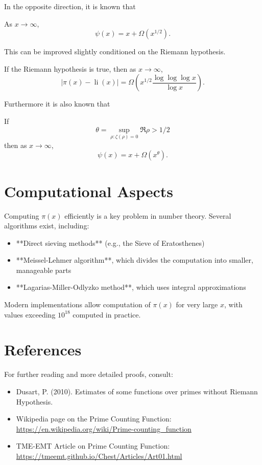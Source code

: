In the opposite direction, it is known that 
\begin{theorem}
As $x \to \infty$,
\[
\psi(x) = x + \Omega(x^{1/2}).
\]
\end{theorem}
This can be improved slightly conditioned on the Riemann hypothesis.
\begin{theorem}
If the Riemann hypothesis is true, then as $x \to \infty$,
\[
|\pi(x) - \operatorname{li}(x)| = \Omega\left(x^{1/2}\frac{\log\log\log x}{\log x}\right).
\]
\end{theorem}

Furthermore it is also known that
\begin{theorem}
If 
\[
\theta = \sup_{\rho: \zeta(\rho) = 0}\Re \rho > 1/2
\]
then as $x \to \infty$,
\[
\psi(x) = x + \Omega(x^{\theta}).
\]
\end{theorem}

\section{Computational Aspects}
Computing $\pi(x)$ efficiently is a key problem in number theory. Several algorithms exist, including:
\begin{itemize}
    \item **Direct sieving methods** (e.g., the Sieve of Eratosthenes)
    \item **Meissel-Lehmer algorithm**, which divides the computation into smaller, manageable parts
    \item **Lagarias-Miller-Odlyzko method**, which uses integral approximations
\end{itemize}
Modern implementations allow computation of $\pi(x)$ for very large $x$, with values exceeding $10^{18}$ computed in practice.

\section{References}
For further reading and more detailed proofs, consult:
\begin{itemize}
    \item Dusart, P. (2010). Estimates of some functions over primes without Riemann Hypothesis.
    \item Wikipedia page on the Prime Counting Function: \url{https://en.wikipedia.org/wiki/Prime-counting_function}
    \item TME-EMT Article on Prime Counting Function: \url{https://tmeemt.github.io/Chest/Articles/Art01.html}
\end{itemize}
